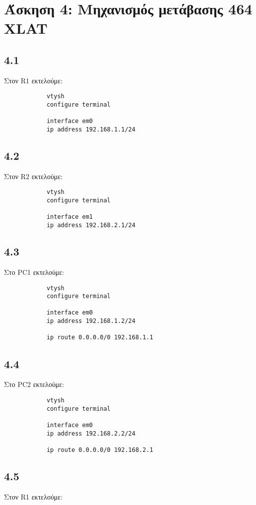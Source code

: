 \documentclass[a4paper, 12pt]{article}
\begin{document}
\section*{Άσκηση 4: Μηχανισμός μετάβασης 464 XLAT}

	\subsection*{4.1}
		Στον R1 εκτελούμε:
		
		\begin{verbatim}
			vtysh
			configure terminal
			
			interface em0
			ip address 192.168.1.1/24
		\end{verbatim}

	\subsection*{4.2}
		Στον R2 εκτελούμε:
		
		\begin{verbatim}
			vtysh 
			configure terminal
			
			interface em1
			ip address 192.168.2.1/24
		\end{verbatim}

	\subsection*{4.3}
		Στο PC1 εκτελούμε:
		
		\begin{verbatim}
			vtysh 
			configure terminal
			
			interface em0
			ip address 192.168.1.2/24
			
			ip route 0.0.0.0/0 192.168.1.1
		\end{verbatim}

	\subsection*{4.4}
		Στο PC2 εκτελούμε:
		
		\begin{verbatim}
			vtysh 
			configure terminal
			
			interface em0
			ip address 192.168.2.2/24
			
			ip route 0.0.0.0/0 192.168.2.1
		\end{verbatim}

	\subsection*{4.5}
		Στον R1 εκτελούμε:
		
\end{document}
